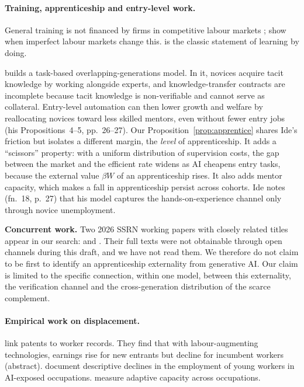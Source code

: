 \documentclass[12pt]{article}
\theoremstyle{remark}
\begin{document}
\paragraph{Training, apprenticeship and entry-level work.} General training is not financed by firms in competitive labour markets \citep{becker1962investment}; \citet{acemoglu1998train,acemoglu1999becker} show when imperfect labour markets change this. \citet{arrow1962learning} is the classic statement of learning by doing.

\citet{ide2025automation} builds a task-based overlapping-generations model. In it, novices acquire tacit knowledge by working alongside experts, and knowledge-transfer contracts are incomplete because tacit knowledge is non-verifiable and cannot serve as collateral. Entry-level automation can then lower growth and welfare by reallocating novices toward less skilled mentors, even without fewer entry jobs (his Propositions~4--5, pp.~26--27). Our Proposition~\ref{prop:apprentice} shares Ide's friction but isolates a different margin, the \emph{level} of apprenticeship. It adds a ``scissors'' property: with a uniform distribution of supervision costs, the gap between the market and the efficient rate widens as AI cheapens entry tasks, because the external value $\beta W$ of an apprenticeship rises. It also adds mentor capacity, which makes a fall in apprenticeship persist across cohorts. Ide notes (fn.~18, p.~27) that his model captures the hands-on-experience channel only through novice unemployment.

\textbf{Concurrent work.} Two 2026 SSRN working papers with closely related titles appear in our search: \citet{akin2026apprenticeship} and \citet{singh2026apprenticeship}. Their full texts were not obtainable through open channels during this draft, and we have not read them. We therefore do not claim to be first to identify an apprenticeship externality from generative AI. Our claim is limited to the specific connection, within one model, between this externality, the verification channel and the cross-generation distribution of the scarce complement.

\paragraph{Empirical work on displacement.} \citet{kogan2023displacement} link patents to worker records. They find that with labour-augmenting technologies, earnings rise for new entrants but decline for incumbent workers (abstract). \citet[August 2026 version]{brynjolfsson2025canaries} document descriptive declines in the employment of young workers in AI-exposed occupations. \citet{manning2026adaptable} measure adaptive capacity across occupations.
\end{document}
